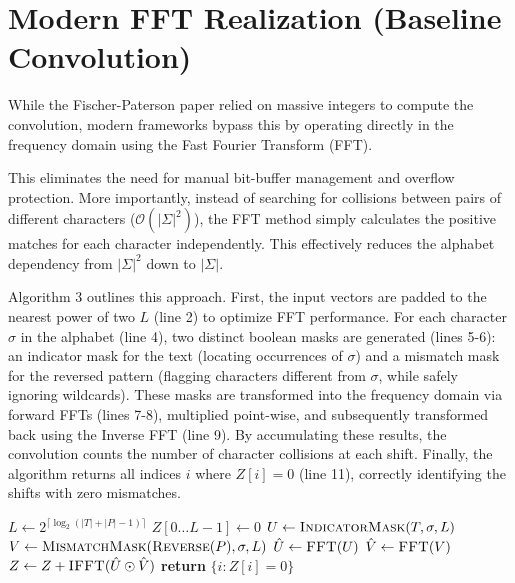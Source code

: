 \section{Modern FFT Realization (Baseline Convolution)}
While the Fischer-Paterson paper relied on massive integers to compute the convolution, modern frameworks bypass this by operating directly in the frequency domain using the Fast Fourier Transform (FFT). 

This eliminates the need for manual bit-buffer management and overflow protection. More importantly, instead of searching for collisions between pairs of different characters ($\mathcal{O}(|\Sigma|^2)$), the FFT method simply calculates the positive matches for each character independently. This effectively reduces the alphabet dependency from $|\Sigma|^2$ down to $|\Sigma|$.

Algorithm 3 outlines this approach. First, the input vectors are padded to the nearest power of two $L$ (line 2) to optimize FFT performance. For each character $\sigma$ in the alphabet (line 4), two distinct boolean masks are generated (lines 5-6): an indicator mask for the text (locating occurrences of $\sigma$) and a mismatch mask for the reversed pattern (flagging characters different from $\sigma$, while safely ignoring wildcards). These masks are transformed into the frequency domain via forward FFTs (lines 7-8), multiplied point-wise, and subsequently transformed back using the Inverse FFT (line 9). By accumulating these results, the convolution counts the number of character collisions at each shift. Finally, the algorithm returns all indices $i$ where $Z[i] = 0$ (line 11), correctly identifying the shifts with zero mismatches.

\begin{algorithm}[H]
\caption{Baseline Character-Masked FFT}
\begin{algorithmic}[1]
    \State $L \gets 2^{\lceil \log_2(|T| + |P| - 1) \rceil}$ 
    \State $Z[0 \dots L-1] \gets 0$
        \State $U \gets \text{\textsc{IndicatorMask}}(T, \sigma, L)$
        \State $V \gets \text{\textsc{MismatchMask}}(\text{\textsc{Reverse}}(P), \sigma, L)$ 
        \State $\hat{U} \gets \text{\textsc{FFT}}(U)$
        \State $\hat{V} \gets \text{\textsc{FFT}}(V)$
        \State $Z \gets Z + \text{\textsc{IFFT}}(\hat{U} \odot \hat{V})$
    \EndFor
    \State \textbf{return} $\{i \colon Z[i] = 0\}$ 
\EndFunction
\end{algorithmic}
\end{algorithm}


